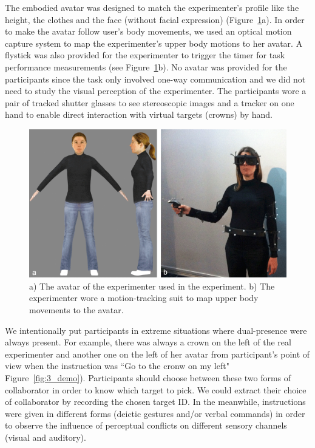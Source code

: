 The embodied avatar was designed to match the experimenter's profile like the height, the clothes and the face (without facial expression) (Figure~\ref{fig:3_avatar}a). In order to make the avatar follow user's body movements, we used an optical motion capture system to map the experimenter's upper body motions to her avatar. A flystick was also provided for the experimenter to trigger the timer for task performance measurements (see Figure~\ref{fig:3_avatar}b). No avatar was provided for the participants since the task only involved one-way communication and we did not need to study the visual perception of the experimenter. The participants wore a pair of tracked shutter glasses to see stereoscopic images and a tracker on one hand to enable direct interaction with virtual targets (crowns) by hand.

\begin{figure}[htb]
  \centering
  \includegraphics[width=.9\textwidth]{figures/ch3/avatar_photo}
  \caption{\label{fig:3_avatar}a) The avatar of the experimenter used in the experiment. b) The experimenter wore a motion-tracking suit to map upper body movements to the avatar.}
\end{figure}

We intentionally put participants in extreme situations where dual-presence were always present. For example, there was always a crown on the left of the real experimenter and another one on the left of her avatar from participant's point of view when the instruction was ``Go to the cronw on my left" Figure~\ref{fig:3_demo}). Participants should choose between these two forms of collaborator in order to know which target to pick. We could extract their choice of collaborator by recording the chosen target ID. In the meanwhile, instructions were given in different forms (deictic gestures and/or verbal commands) in order to observe the influence of perceptual conflicts on different sensory channels (visual and auditory).


